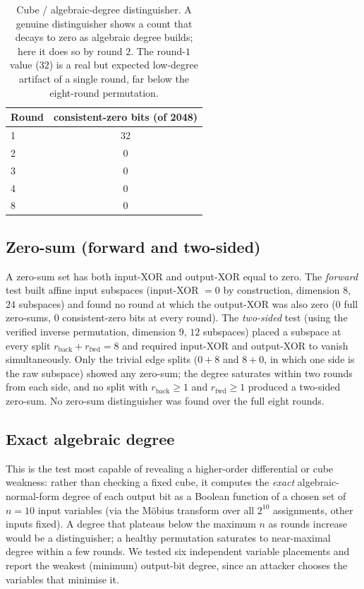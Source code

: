 \documentclass[11pt]{article}
\begin{document}
\begin{table}[h]
\centering
\begin{tabular}{lc}
  \toprule
  \textbf{Round} & \textbf{consistent-zero bits (of 2048)} \\
  \midrule
  1 & 32 \\
  2 & 0 \\
  3 & 0 \\
  4 & 0 \\
  8 & 0 \\
  \bottomrule
\end{tabular}
\caption{Cube / algebraic-degree distinguisher. A genuine distinguisher shows a
count that decays to zero as algebraic degree builds; here it does so by round
$2$. The round-$1$ value ($32$) is a real but expected low-degree artifact of a
single round, far below the eight-round permutation.}
\end{table}

\subsection{Zero-sum (forward and two-sided)}
A zero-sum set has both input-XOR and output-XOR equal to zero. The
\emph{forward} test built affine input subspaces (input-XOR $=0$ by
construction, dimension $8$, $24$ subspaces) and found no round at which the
output-XOR was also zero ($0$ full zero-sums, $0$ consistent-zero bits at every
round). The \emph{two-sided} test (using the verified inverse permutation,
dimension $9$, $12$ subspaces) placed a subspace at every split
$r_{\text{back}}+r_{\text{fwd}}=8$ and required input-XOR and output-XOR to
vanish simultaneously. Only the trivial edge splits ($0\!+\!8$ and $8\!+\!0$, in
which one side is the raw subspace) showed any zero-sum; the degree saturates
within two rounds from each side, and no split with $r_{\text{back}}\ge1$ and
$r_{\text{fwd}}\ge1$ produced a two-sided zero-sum. No zero-sum distinguisher was
found over the full eight rounds.

\subsection{Exact algebraic degree}
This is the test most capable of revealing a higher-order differential or cube
weakness: rather than checking a fixed cube, it computes the \emph{exact}
algebraic-normal-form degree of each output bit as a Boolean function of a chosen
set of $n=10$ input variables (via the M\"obius transform over all $2^{10}$
assignments, other inputs fixed). A degree that plateaus below the maximum $n$ as
rounds increase would be a distinguisher; a healthy permutation saturates to
near-maximal degree within a few rounds. We tested six independent variable
placements and report the weakest (minimum) output-bit degree, since an attacker
chooses the variables that minimise it.
\end{document}
